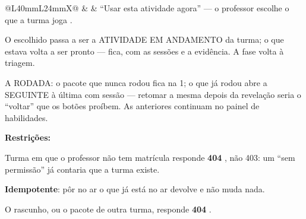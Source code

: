 \begin{tabularx}{\linewidth}{@{}L{40mm}L{24mm}X@{}}
\zebra {} &  & \enquote{Usar esta atividade agora} --- o professor escolhe o que a turma joga .\par O escolhido passa a ser a ATIVIDADE EM ANDAMENTO da turma; o que estava volta a ser pronto --- fica, com as sessões e a evidência. A fase volta à triagem.\par A RODADA: o pacote que nunca rodou fica na 1; o que já rodou abre a SEGUINTE à última com sessão --- retomar a mesma depois da revelação seria o \enquote{voltar} que os botões proíbem. As anteriores continuam no painel de habilidades.\par \textbf{Restrições:}\par \hspace*{1em}\textbullet{} Turma em que o professor não tem matrícula responde \textbf{404} , não 403: um \enquote{sem permissão} já contaria que a turma existe.\par \hspace*{1em}\textbullet{} \textbf{Idempotente}: pôr no ar o que já está no ar devolve  e não muda nada.\par \hspace*{1em}\textbullet{} O rascunho, ou o pacote de outra turma, responde \textbf{404} .\\

\end{tabularx}
